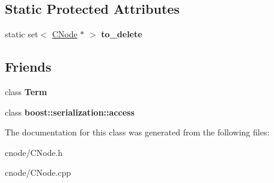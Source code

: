 \subsection*{\-Static \-Protected \-Attributes}
\begin{DoxyCompactItemize}
\item 
\hypertarget{classCNode_a74efc8365bd9706fe45d4adfbbfab2ea}{static set$<$ \hyperlink{classCNode}{\-C\-Node} $\ast$ $>$ {\bfseries to\-\_\-delete}}\label{classCNode_a74efc8365bd9706fe45d4adfbbfab2ea}

\end{DoxyCompactItemize}
\subsection*{\-Friends}
\begin{DoxyCompactItemize}
\item 
\hypertarget{classCNode_a93def3190d5eacce69517079e5886ec2}{class {\bfseries \-Term}}\label{classCNode_a93def3190d5eacce69517079e5886ec2}

\item 
\hypertarget{classCNode_ac98d07dd8f7b70e16ccb9a01abf56b9c}{class {\bfseries boost\-::serialization\-::access}}\label{classCNode_ac98d07dd8f7b70e16ccb9a01abf56b9c}

\end{DoxyCompactItemize}


\-The documentation for this class was generated from the following files\-:\begin{DoxyCompactItemize}
\item 
cnode/\-C\-Node.\-h\item 
cnode/\-C\-Node.\-cpp\end{DoxyCompactItemize}
